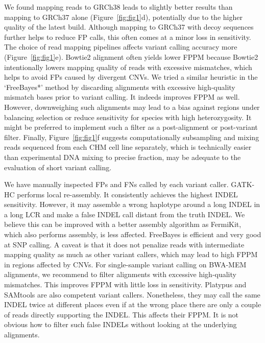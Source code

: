 \documentclass{bioinfo}
\begin{document}
We found mapping reads to GRCh38 leads to slightly better results than mapping
to GRCh37 alone (Figure~\ref{fig:fig1}d), potentially due to the higher quality
of the latest build. Although mapping to GRCh37 with decoy sequences further
helps to reduce FP calls, this often comes at a minor loss in sensitivity.
The choice of read mapping pipelines affects variant calling accuracy more
(Figure~\ref{fig:fig1}e). Bowtie2 alignment often yields lower FPPM because
Bowtie2 intentionally lowers mapping quality of reads with excessive
mismatches, which helps to avoid FPs caused by divergent CNVs.  We tried a
similar heuristic in the `FreeBayes*' method by discarding alignments with
excessive high-quality mismatch bases prior to variant calling. It indeeds
improves FPPM as well.  However, downweighing such alignments may lead to a
bias against regions under balancing selection or reduce sensitivity for
species with high heterozygosity. It might be preferred to implement such a
filter as a post-alignment or post-variant filter. Finally,
Figure~\ref{fig:fig1}f suggests computationally subsampling and mixing reads
sequenced from each CHM cell line separately, which is technically easier than
experimental DNA mixing to precise fraction, may be adequate to the evaluation
of short variant calling.

We have manually inspected FPs and FNs called by each variant caller. GATK-HC
performs local re-assembly. It consistently achieves the highest INDEL
sensitivity.  However, it may assemble a wrong haplotype around a long INDEL in
a long LCR and make a false INDEL call distant from the truth INDEL. We believe
this can be improved with a better assembly algorithm as FermiKit, which also
performs assembly, is less affected.  FreeBayes is efficient and very good at
SNP calling. A caveat is that it does not penalize reads with intermediate
mapping quality as much as other variant callers, which may lead to high
FPPM in regions affected by CNVs.  For single-sample variant calling on
BWA-MEM alignments, we recommend to filter alignments with excessive
high-quality mismatches. This improves FPPM with little loss in sensitivity.
Platypus and SAMtools are also competent variant callers. Nonetheless, they may
call the same INDEL twice at different places even if at the wrong place there
are only a couple of reads directly supporting the INDEL. This affects their
FPPM.  It is not obvious how to filter such false INDELs without looking at the
underlying alignments.
\end{document}
